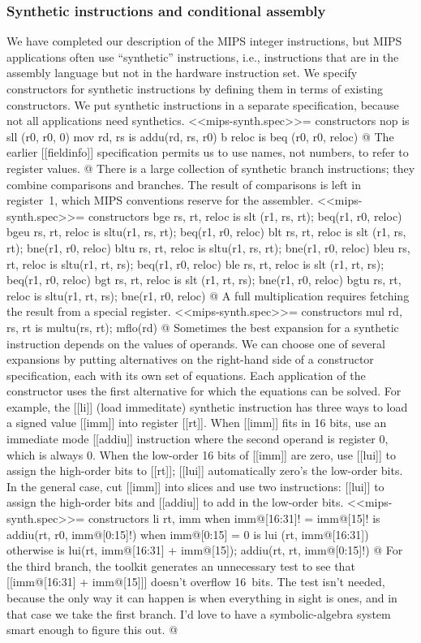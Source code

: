 \subsubsection{Synthetic instructions and conditional assembly}
\label{sec:synth}
We have completed our description of the MIPS integer instructions,
but MIPS 
applications often use ``synthetic'' instructions, 
i.e., instructions that are in the assembly
language but not in the hardware instruction set.
We specify constructors for synthetic instructions by defining them in
terms of existing constructors.
We put synthetic instructions in a separate specification, 
because not all applications need synthetics.
<<mips-synth.spec>>=
constructors
  nop         	is  sll (r0, r0, 0)
  mov rd, rs    is  addu(rd, rs, r0)
  b reloc     	is  beq (r0, r0, reloc)
@ The earlier [[fieldinfo]] specification permits us to use
names, not numbers, to refer to register values.
@
There is a large collection of synthetic branch instructions; they
combine comparisons and branches.  The result of comparisons is left
in register~1, which MIPS conventions reserve for the assembler.
<<mips-synth.spec>>=
constructors
  bge  rs, rt, reloc  is  slt (r1, rs, rt);  beq(r1, r0, reloc)
  bgeu rs, rt, reloc  is  sltu(r1, rs, rt);  beq(r1, r0, reloc)
  blt  rs, rt, reloc  is  slt (r1, rs, rt);  bne(r1, r0, reloc)
  bltu rs, rt, reloc  is  sltu(r1, rs, rt);  bne(r1, r0, reloc)
  bleu rs, rt, reloc  is  sltu(r1, rt, rs);  beq(r1, r0, reloc)
  ble  rs, rt, reloc  is  slt (r1, rt, rs);  beq(r1, r0, reloc)
  bgt  rs, rt, reloc  is  slt (r1, rt, rs);  bne(r1, r0, reloc)
  bgtu rs, rt, reloc  is  sltu(r1, rt, rs);  bne(r1, r0, reloc)
@
A full multiplication requires fetching the result from a special register.
<<mips-synth.spec>>=
constructors
  mul rd, rs, rt  is  multu(rs, rt); mflo(rd)
@
Sometimes the best expansion for a synthetic 
instruction depends on the values of operands.
We can choose one of several expansions by putting alternatives
on the right-hand side of a constructor specification,
each with its own set of equations.
Each application of the constructor uses the first alternative for
which the equations can be solved.
For example, the [[li]] (load immeditate) synthetic instruction has
three ways to load a signed value [[imm]] into register [[rt]].
When [[imm]] fits in 16 bits, use an immediate mode [[addiu]] instruction
where the second operand is register 0, which is always 0.
When the low-order 16 bits of [[imm]] are zero, 
use [[lui]] to assign the high-order bits to [[rt]];
[[lui]] automatically zero's the low-order bits.
In the general case, cut [[imm]] into slices and use two instructions:
[[lui]] to assign the high-order bits and [[addiu]] to add in the low-order
bits.
<<mips-synth.spec>>=
constructors
  li rt, imm  when { imm@[16:31]! = imm@[15]! } is addiu(rt, r0, imm@[0:15]!)
              when { imm@[0:15] = 0 }           is lui  (rt, imm@[16:31])
              otherwise is lui(rt, imm@[16:31] + imm@[15]); addiu(rt, rt, imm@[0:15]!)
@ For the third branch, the toolkit generates an unnecessary test to
see that [[imm@[16:31] + imm@[15]]] doesn't overflow 16~bits.
The test isn't needed, because the only way it can happen is when
everything in sight is ones, and in that case we take the first
branch.
I'd love to have a symbolic-algebra system smart enough to figure this out.
@
